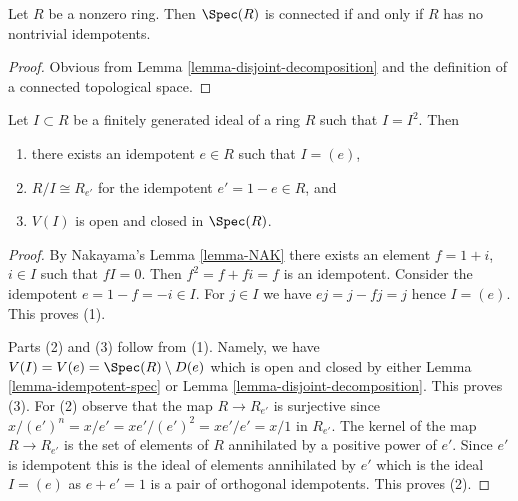 \begin{lemma}
\label{lemma-characterize-spec-connected}
Let $R$ be a nonzero ring. Then $\Spec(R)$ is
connected if and only if $R$ has no nontrivial
idempotents.
\end{lemma}

\begin{proof}
Obvious from Lemma \ref{lemma-disjoint-decomposition}
and the definition of a connected topological space.
\end{proof}

\begin{lemma}
\label{lemma-ideal-is-squared-union-connected}
Let $I \subset R$ be a finitely generated ideal of a ring $R$
such that $I = I^2$. Then
\begin{enumerate}
\item there exists an idempotent $e \in R$ such that $I = (e)$,
\item $R/I \cong R_{e'}$ for the idempotent $e' = 1 - e \in R$, and
\item $V(I)$ is open and closed in $\Spec(R)$.
\end{enumerate}
\end{lemma}

\begin{proof}
By Nakayama's Lemma \ref{lemma-NAK} there exists an element
$f = 1 + i$, $i \in I$ such that $fI = 0$. Then $f^2 = f + fi = f$
is an idempotent. Consider the idempotent $e = 1 - f = -i \in I$.
For $j \in I$ we have $ej = j - fj = j$ hence $I = (e)$.
This proves (1).

\medskip\noindent
Parts (2) and (3) follow from (1). Namely, we have
$V(I) = V(e) = \Spec(R) \setminus D(e)$ which is open and
closed by either Lemma \ref{lemma-idempotent-spec} or
Lemma \ref{lemma-disjoint-decomposition}. This proves (3).
For (2) observe that the map $R \to R_{e'}$ is surjective
since $x/(e')^n = x/e' = xe'/(e')^2 = xe'/e' = x/1$ in $R_{e'}$.
The kernel of the map $R \to R_{e'}$ is the set of elements of
$R$ annihilated by a positive power of $e'$. Since $e'$ is
idempotent this is the ideal of elements annihilated by $e'$
which is the ideal $I = (e)$ as $e + e' = 1$ is a pair
of orthogonal idempotents. This proves (2).
\end{proof}






